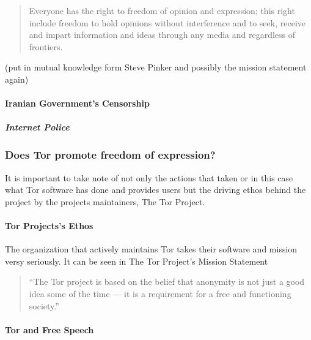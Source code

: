 \documentclass[11pt]{article}
\begin{document}
\begin{multicols}{2}
\begin{quotation} Everyone has the right to freedom of opinion and expression;
  this right include freedom to hold opinions without interference and to seek,
  receive and impart information and ideas through any media and regardless of
  frontiers.  \cite{UniversalDeclerationOfHumanRights}
\end{quotation}

(put in mutual knowledge form Steve Pinker and possibly the mission statement
again)


\paragraph{Iranian Government's Censorship}


\subparagraph{Internet Police}


\subsubsection{Does Tor promote freedom of expression?}

It is important to take note of not only the actions that taken or in this case
what Tor software has done and provides users but the driving ethos behind the
project by the projects maintainers, The Tor Project.

\paragraph{Tor Projects's Ethos}

The organization that actively maintains Tor takes their software and mission
versy seriously. It can be seen in The Tor Project's Mission Statement


\begin{quotation} 
  
  ``The Tor project is based on the belief that anonymity is not just a good
  idea some of the time — it is a requirement for a free and functioning
  society.''\cite{Tor:Users}

\end{quotation}



%

\paragraph{Tor and Free Speech}


\end{multicols}
\end{document}
